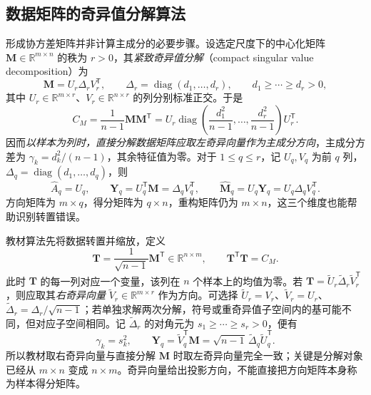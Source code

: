 \subsection{数据矩阵的奇异值分解算法}
\label{subsec:lh-pca-svd}

形成协方差矩阵并非计算主成分的必要步骤。设选定尺度下的中心化矩阵 $\mathbf M\in\mathbb R^{m\times n}$ 的秩为 $r>0$，其\emph{紧致奇异值分解}（compact singular value decomposition）为
\begin{equation}
\mathbf M=U_r\Delta_rV_r^{\mathsf T},\qquad
\Delta_r=\operatorname{diag}(d_1,\ldots,d_r),\qquad
d_1\geq\cdots\geq d_r>0,
\label{eq:lh-pca-data-svd}
\end{equation}
其中 $U_r\in\mathbb R^{m\times r}$、$V_r\in\mathbb R^{n\times r}$ 的列分别标准正交。于是
\begin{equation}
C_M=\frac1{n-1}\mathbf M\mathbf M^{\mathsf T}
=U_r\operatorname{diag}\left(\frac{d_1^2}{n-1},\ldots,
\frac{d_r^2}{n-1}\right)U_r^{\mathsf T}.
\label{eq:lh-pca-svd-covariance}
\end{equation}
因而\emph{以样本为列时，直接分解数据矩阵应取左奇异向量作为主成分方向}，主成分方差为 $\gamma_k=d_k^2/(n-1)$，其余特征值为零。对于 $1\leq q\leq r$，记 $U_q,V_q$ 为前 $q$ 列，$\Delta_q=\operatorname{diag}(d_1,\ldots,d_q)$，则
\begin{equation}
\widehat A_q=U_q,\qquad
\mathbf Y_q=U_q^{\mathsf T}\mathbf M=\Delta_qV_q^{\mathsf T},\qquad
\widehat{\mathbf M}_q=U_q\mathbf Y_q
=U_q\Delta_qV_q^{\mathsf T}.
\label{eq:lh-pca-svd-scores}
\end{equation}
方向矩阵为 $m\times q$，得分矩阵为 $q\times n$，重构矩阵仍为 $m\times n$，这三个维度也能帮助识别转置错误。

教材算法先将数据转置并缩放，定义
\begin{equation}
\mathbf T=\frac1{\sqrt{n-1}}\mathbf M^{\mathsf T}
\in\mathbb R^{n\times m},\qquad
\mathbf T^{\mathsf T}\mathbf T=C_M.
\label{eq:lh-pca-transposed-data}
\end{equation}
此时 $\mathbf T$ 的每一列对应一个变量，该列在 $n$ 个样本上的均值为零。若 $\mathbf T=\widetilde U_r\widetilde\Delta_r\widetilde V_r^{\mathsf T}$，则应取其\emph{右奇异向量} $\widetilde V_r\in\mathbb R^{m\times r}$ 作为方向。可选择 $\widetilde U_r=V_r$、$\widetilde V_r=U_r$、$\widetilde\Delta_r=\Delta_r/\sqrt{n-1}$；若单独求解两次分解，符号或重奇异值子空间内的基可能不同，但对应子空间相同。记 $\widetilde\Delta_r$ 的对角元为 $s_1\geq\cdots\geq s_r>0$，便有
\begin{equation}
\gamma_k=s_k^2,\qquad
\mathbf Y_q=\widetilde V_q^{\mathsf T}\mathbf M
=\sqrt{n-1}\,\widetilde\Delta_q\widetilde U_q^{\mathsf T}.
\label{eq:lh-pca-transposed-scores}
\end{equation}
所以教材取右奇异向量与直接分解 $\mathbf M$ 时取左奇异向量完全一致；关键是分解对象已经从 $m\times n$ 变成 $n\times m$。奇异向量给出投影方向，不能直接把方向矩阵本身称为样本得分矩阵。


